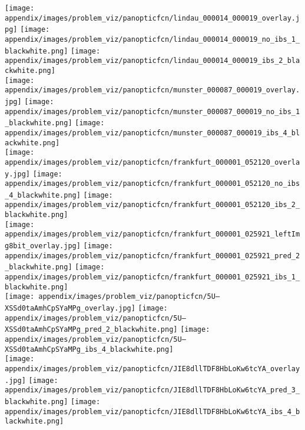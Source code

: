 \documentclass[10pt,twocolumn,letterpaper]{article}
\begin{document}
\begin{figure*}[t]
\centering
\texttt{[image: appendix/images/problem\_viz/panopticfcn/lindau\_000014\_000019\_overlay.jpg]}
\texttt{[image: appendix/images/problem\_viz/panopticfcn/lindau\_000014\_000019\_no\_ibs\_1\_blackwhite.png]}
\texttt{[image: appendix/images/problem\_viz/panopticfcn/lindau\_000014\_000019\_ibs\_2\_blackwhite.png]}\\

\texttt{[image: appendix/images/problem\_viz/panopticfcn/munster\_000087\_000019\_overlay.jpg]}
\texttt{[image: appendix/images/problem\_viz/panopticfcn/munster\_000087\_000019\_no\_ibs\_1\_blackwhite.png]}
\texttt{[image: appendix/images/problem\_viz/panopticfcn/munster\_000087\_000019\_ibs\_4\_blackwhite.png]}\\

\texttt{[image: appendix/images/problem\_viz/panopticfcn/frankfurt\_000001\_052120\_overlay.jpg]}
\texttt{[image: appendix/images/problem\_viz/panopticfcn/frankfurt\_000001\_052120\_no\_ibs\_4\_blackwhite.png]}
\texttt{[image: appendix/images/problem\_viz/panopticfcn/frankfurt\_000001\_052120\_ibs\_2\_blackwhite.png]}\\

\texttt{[image: appendix/images/problem\_viz/panopticfcn/frankfurt\_000001\_025921\_leftImg8bit\_overlay.jpg]}
\texttt{[image: appendix/images/problem\_viz/panopticfcn/frankfurt\_000001\_025921\_pred\_2\_blackwhite.png]}
\texttt{[image: appendix/images/problem\_viz/panopticfcn/frankfurt\_000001\_025921\_ibs\_1\_blackwhite.png]}\\


\texttt{[image: appendix/images/problem\_viz/panopticfcn/5U--XSSd0taAmhCpSYaMPg\_overlay.jpg]}
\texttt{[image: appendix/images/problem\_viz/panopticfcn/5U--XSSd0taAmhCpSYaMPg\_pred\_2\_blackwhite.png]}
\texttt{[image: appendix/images/problem\_viz/panopticfcn/5U--XSSd0taAmhCpSYaMPg\_ibs\_4\_blackwhite.png]}\\

\texttt{[image: appendix/images/problem\_viz/panopticfcn/JIE8dllTDF8HbLoKw6tcYA\_overlay.jpg]}
\texttt{[image: appendix/images/problem\_viz/panopticfcn/JIE8dllTDF8HbLoKw6tcYA\_pred\_3\_blackwhite.png]}
\texttt{[image: appendix/images/problem\_viz/panopticfcn/JIE8dllTDF8HbLoKw6tcYA\_ibs\_4\_blackwhite.png]}\\


\end{figure*}
\end{document}
